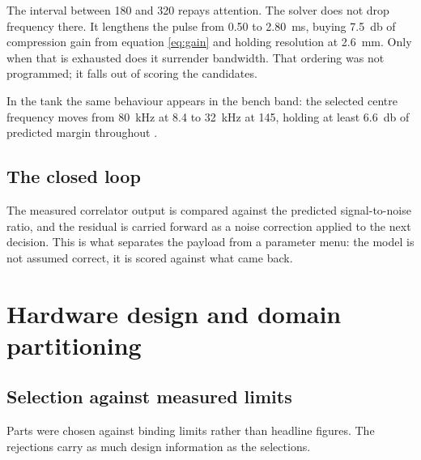 \documentclass[conference,a4paper]{IEEEtran}
\begin{document}
The interval between \SI{180}{} and \SI{320}{\NTU} repays attention. The solver
does not drop frequency there. It lengthens the pulse from \SI{0.50}{} to
\SI{2.80}{\milli\second}, buying \SI{7.5}{\decibel} of compression gain from
equation \eqref{eq:gain} and holding resolution at \SI{2.6}{\milli\metre}. Only
when that is exhausted does it surrender bandwidth. That ordering was not
programmed; it falls out of scoring the candidates.

In the tank the same behaviour appears in the bench band: the selected centre
frequency moves from \SI{80}{\kilo\hertz} at \SI{8.4}{\NTU} to
\SI{32}{\kilo\hertz} at \SI{145}{\NTU}, holding at least \SI{6.6}{\decibel} of
predicted margin throughout .

\subsection{The closed loop}

The measured correlator output is compared against the predicted
signal-to-noise ratio, and the residual is carried forward as a noise
correction applied to the next decision. This is what separates the payload
from a parameter menu: the model is not assumed correct, it is scored against
what came back.


\section{Hardware design and domain partitioning}
\label{sec:hardware}

\subsection{Selection against measured limits}

Parts were chosen against binding limits rather than headline figures. The
rejections carry as much design information as the selections.
\end{document}
